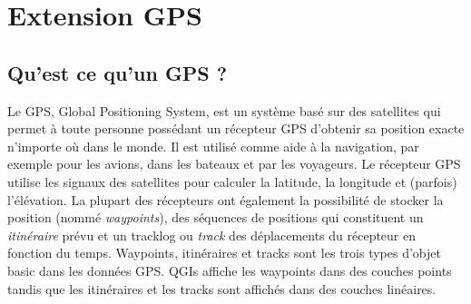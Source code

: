 
\section{Extension GPS}\label{label_plugingps}


\subsection{Qu'est ce qu'un GPS ?}\label{whatsgps}

Le GPS, Global Positioning System, est un système basé sur des satellites qui permet à toute personne possédant un récepteur GPS d'obtenir sa position exacte n'importe où dans le monde. Il est utilisé comme aide à la navigation, par exemple pour les avions, dans les bateaux et par les voyageurs.
Le récepteur GPS utilise les signaux des satellites pour calculer la latitude, la longitude et (parfois) l'élévation.
La plupart des récepteurs ont également la possibilité de stocker la position (nommé \emph{waypoints}), des séquences de positions qui constituent un
\emph{itinéraire} prévu et un tracklog ou \emph{track} des déplacements du récepteur en fonction du temps.
Waypoints, itinéraires et tracks sont les trois types d'objet basic dans les données GPS. QGIs affiche les waypoints dans des couches points tandis que les itinéraires et les tracks sont affichés dans des couches linéaires.

